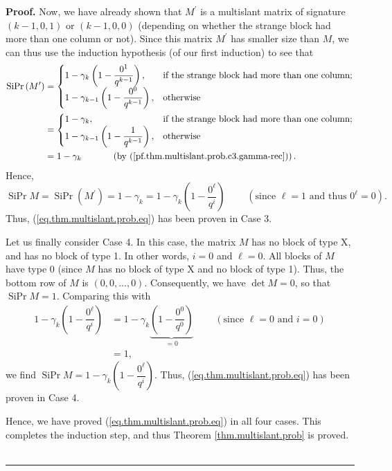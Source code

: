 \documentclass[numbers=enddot,12pt,final,onecolumn,notitlepage]{scrartcl}%
\theoremstyle{definition}
\newenvironment{proof}[1][Proof]{\noindent\textbf{#1.} }{\ \rule{0.5em}{0.5em}}
\theoremstyle{plainsl}
\begin{document}
\begin{proof}
Now, we have already shown that $M^{\prime}$ is a multislant matrix of
signature $\left(  k-1,0,1\right)  $ or $\left(  k-1,0,0\right)  $ (depending
on whether the strange block had more than one column or not). Since this
matrix $M^{\prime}$ has smaller size than $M$, we can thus use the induction
hypothesis (of our first induction) to see that%
\begin{align*}
\operatorname*{SiPr}\left(  M^{\prime}\right)   &  =%
\begin{cases}
1-\gamma_{k}\left(  1-\dfrac{0^{1}}{q^{k-1}}\right)  , & \text{if the strange
block had more than one column};\\
1-\gamma_{k-1}\left(  1-\dfrac{0^{0}}{q^{k-1}}\right)  , & \text{otherwise}%
\end{cases}
\\
&  =%
\begin{cases}
1-\gamma_{k}, & \text{if the strange block had more than one column};\\
1-\gamma_{k-1}\left(  1-\dfrac{1}{q^{k-1}}\right)  , & \text{otherwise}%
\end{cases}
\\
&  =1-\gamma_{k}\ \ \ \ \ \ \ \ \ \ \left(  \text{by
(\ref{pf.thm.multislant.prob.c3.gamma-rec})}\right)  .
\end{align*}
Hence,%
\[
\operatorname*{SiPr}M=\operatorname*{SiPr}\left(  M^{\prime}\right)
=1-\gamma_{k}=1-\gamma_{k}\left(  1-\dfrac{0^{\ell}}{q^{i}}\right)
\ \ \ \ \ \ \ \ \ \ \left(  \text{since }\ell=1\text{ and thus }0^{\ell
}=0\right)  .
\]
Thus, (\ref{eq.thm.multislant.prob.eq}) has been proven in Case 3.

Let us finally consider Case 4. In this case, the matrix $M$ has no block of
type X, and has no block of type 1. In other words, $i=0$ and $\ell=0$. All
blocks of $M$ have type 0 (since $M$ has no block of type X and no block of
type 1). Thus, the bottom row of $M$ is $\left(  0,0,\ldots,0\right)  $.
Consequently, we have $\det M=0$, so that $\operatorname*{SiPr}M=1$. Comparing
this with%
\begin{align*}
1-\gamma_{k}\left(  1-\dfrac{0^{\ell}}{q^{i}}\right)   &  =1-\gamma
_{k}\underbrace{\left(  1-\dfrac{0^{0}}{q^{0}}\right)  }_{=0}%
\ \ \ \ \ \ \ \ \ \ \left(  \text{since }\ell=0\text{ and }i=0\right) \\
&  =1,
\end{align*}
we find $\operatorname*{SiPr}M=1-\gamma_{k}\left(  1-\dfrac{0^{\ell}}{q^{i}%
}\right)  $. Thus, (\ref{eq.thm.multislant.prob.eq}) has been proven in Case 4.

Hence, we have proved (\ref{eq.thm.multislant.prob.eq}) in all four cases.
This completes the induction step, and thus Theorem \ref{thm.multislant.prob}
is proved.
\end{proof}
\end{document}

